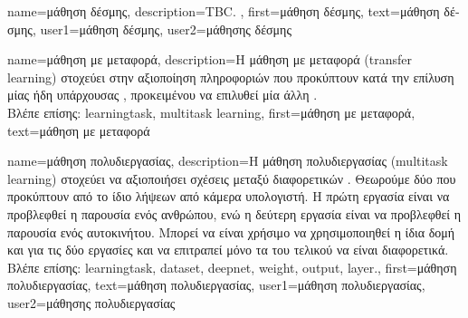 {name={\foreignlanguage{greek}{μάθηση δέσμης}},
	description={TBC. },
	first={\foreignlanguage{greek}{μάθηση δέσμης}}, 
	text={\foreignlanguage{greek}{μάθηση δέσμης}},
	user1={\foreignlanguage{greek}{μάθηση δέσμης}}, %
	user2={\foreignlanguage{greek}{μάθησης δέσμης}} %
}

{name={\foreignlanguage{greek}{μάθηση με μεταφορά}},
	description={\foreignlanguage{greek}{Η μάθηση με μεταφορά} (transfer learning) 
		\foreignlanguage{greek}{στοχεύει στην αξιοποίηση πληροφοριών που προκύπτουν κατά την επίλυση μίας ήδη υπάρχουσας}  
		, \foreignlanguage{greek}{προκειμένου να επιλυθεί μία άλλη} .
		\\ 
   		\foreignlanguage{greek}{Βλέπε επίσης:} \gls{learningtask}, \gls{multitask learning}},
  	first={\foreignlanguage{greek}{μάθηση με μεταφορά}},
  	text={\foreignlanguage{greek}{μάθηση με μεταφορά}}
}%

{name={\foreignlanguage{greek}{μάθηση πολυδιεργασίας}},
	description={\foreignlanguage{greek}{Η μάθηση πολυδιεργασίας} 
		(multitask learning) \foreignlanguage{greek}{στοχεύει να αξιοποιήσει σχέσεις μεταξύ διαφορετικών} . 
		\foreignlanguage{greek}{Θεωρούμε δύο}  \foreignlanguage{greek}{που προκύπτουν από το ίδιο}  
	 	 \foreignlanguage{greek}{λήψεων από κάμερα υπολογιστή. Η πρώτη εργασία είναι να προβλεφθεί η 
		παρουσία ενός ανθρώπου, ενώ η δεύτερη εργασία είναι να προβλεφθεί η παρουσία ενός αυτοκινήτου. 
	 	Μπορεί να είναι χρήσιμο να χρησιμοποιηθεί η ίδια δομή}  \foreignlanguage{greek}{και για τις δύο 
		εργασίες και να επιτραπεί μόνο τα}  \foreignlanguage{greek}{του τελικού} 
		 \foreignlanguage{greek}{να είναι διαφορετικά.} 
		\\
	 	\foreignlanguage{greek}{Βλέπε επίσης:} \gls{learningtask}, \gls{dataset}, \gls{deepnet}, \gls{weight}, \gls{output}, \gls{layer}.},
	first={\foreignlanguage{greek}{μάθηση πολυδιεργασίας}},
	text={\foreignlanguage{greek}{μάθηση πολυδιεργασίας}},
	user1={\foreignlanguage{greek}{μάθηση πολυδιεργασίας}}, %
	user2={\foreignlanguage{greek}{μάθησης πολυδιεργασίας}} %
}

